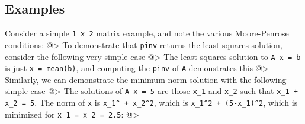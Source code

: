 \subsection{Examples}

Consider a simple \verb|1 x 2| matrix example, and note the various
Moore-Penrose conditions:
@>
To demonstrate that \verb|pinv| returns the least squares solution,
consider the following very simple case
@>
The least squares solution to \verb|A x = b| is just \verb|x = mean(b)|,
and computing the \verb|pinv| of \verb|A| demonstrates this
@>
Similarly, we can demonstrate the minimum norm solution with
the following simple case
@>
The solutions of \verb|A x = 5| are those \verb|x_1| and \verb|x_2| such that
\verb|x_1 + x_2 = 5|.  The norm of \verb|x| is \verb|x_1^ + x_2^2|, which is
\verb|x_1^2 + (5-x_1)^2|, which is minimized for \verb|x_1 = x_2 = 2.5|:
@>

